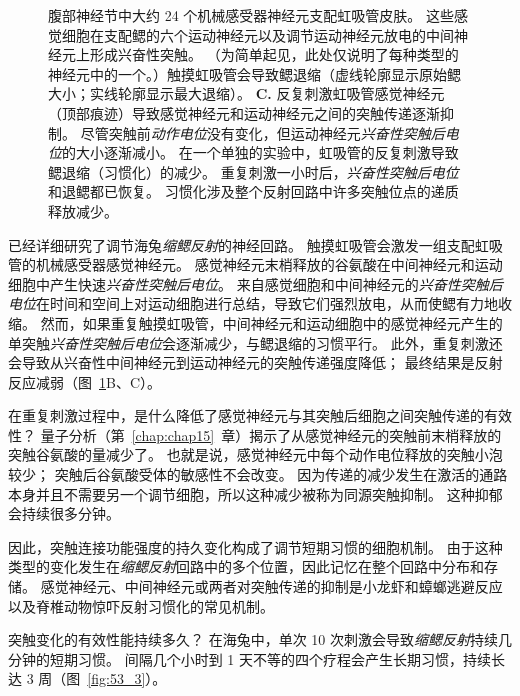 \begin{figure}[htbp]
{		腹部神经节中大约 24 个机械感受器神经元支配虹吸管皮肤。
		这些感觉细胞在支配鳃的六个运动神经元以及调节运动神经元放电的中间神经元上形成兴奋性突触。
		（为简单起见，此处仅说明了每种类型的神经元中的一个。）触摸虹吸管会导致鳃退缩（虚线轮廓显示原始鳃大小；实线轮廓显示最大退缩）。
		\textbf{C.} 反复刺激虹吸管感觉神经元（顶部痕迹）导致感觉神经元和运动神经元之间的突触传递逐渐抑制。
		尽管突触前\textit{动作电位}没有变化，但运动神经元\textit{兴奋性突触后电位}的大小逐渐减小。
		在一个单独的实验中，虹吸管的反复刺激导致鳃退缩（习惯化）的减少。
		重复刺激一小时后，\textit{兴奋性突触后电位}和退鳃都已恢复。
		习惯化涉及整个反射回路中许多突触位点的递质释放减少\cite{pinsker1970habituation}。}
	\label{fig:53_2}
\end{figure}


已经详细研究了调节海兔\textit{缩鳃反射}的神经回路。
触摸虹吸管会激发一组支配虹吸管的机械感受器感觉神经元。
感觉神经元末梢释放的谷氨酸在中间神经元和运动细胞中产生快速\textit{兴奋性突触后电位}。
来自感觉细胞和中间神经元的\textit{兴奋性突触后电位}在时间和空间上对运动细胞进行总结，导致它们强烈放电，从而使鳃有力地收缩。
然而，如果重复触摸虹吸管，中间神经元和运动细胞中的感觉神经元产生的单突触\textit{兴奋性突触后电位}会逐渐减少，与鳃退缩的习惯平行。
此外，重复刺激还会导致从兴奋性中间神经元到运动神经元的突触传递强度降低；
最终结果是反射反应减弱（图~\ref{fig:53_2}B、C）。


在重复刺激过程中，是什么降低了感觉神经元与其突触后细胞之间突触传递的有效性？
量子分析（第~\ref{chap:chap15}~章）揭示了从感觉神经元的突触前末梢释放的突触谷氨酸的量减少了。
也就是说，感觉神经元中每个动作电位释放的突触小泡较少；
突触后谷氨酸受体的敏感性不会改变。
因为传递的减少发生在激活的通路本身并且不需要另一个调节细胞，所以这种减少被称为同源突触抑制。
这种抑郁会持续很多分钟。


因此，突触连接功能强度的持久变化构成了调节短期习惯的细胞机制。
由于这种类型的变化发生在\textit{缩鳃反射}回路中的多个位置，因此记忆在整个回路中分布和存储。
感觉神经元、中间神经元或两者对突触传递的抑制是小龙虾和蟑螂逃避反应以及脊椎动物惊吓反射习惯化的常见机制。


突触变化的有效性能持续多久？
在海兔中，单次 10 次刺激会导致\textit{缩鳃反射}持续几分钟的短期习惯。
间隔几个小时到 1 天不等的四个疗程会产生长期习惯，持续长达 3 周（图~\ref{fig:53_3}）。


